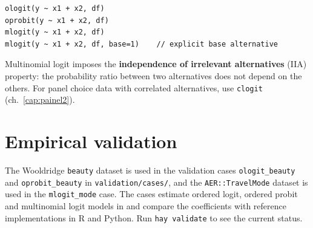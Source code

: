 \begin{lstlisting}
ologit(y ~ x1 + x2, df)
oprobit(y ~ x1 + x2, df)
mlogit(y ~ x1 + x2, df)
mlogit(y ~ x1 + x2, df, base=1)    // explicit base alternative
\end{lstlisting}

\begin{nota}
  Multinomial logit imposes the \textbf{independence of irrelevant alternatives}
  (IIA) property: the probability ratio between two alternatives does not depend
  on the others. For panel choice data with correlated alternatives, use
  \lstinline{clogit} (ch.~\ref{cap:painel2}).
\end{nota}

\section{Empirical validation}

The Wooldridge \texttt{beauty} dataset is used in the validation cases
\texttt{ologit_beauty} and \texttt{oprobit_beauty} in \texttt{validation/cases/},
and the \texttt{AER::TravelMode} dataset is used in the \texttt{mlogit_mode} case.
The cases estimate ordered logit, ordered probit and multinomial logit models in
\hayashi{} and compare the coefficients with reference implementations in R and
Python. Run \lstinline{hay validate} to see the current status.
